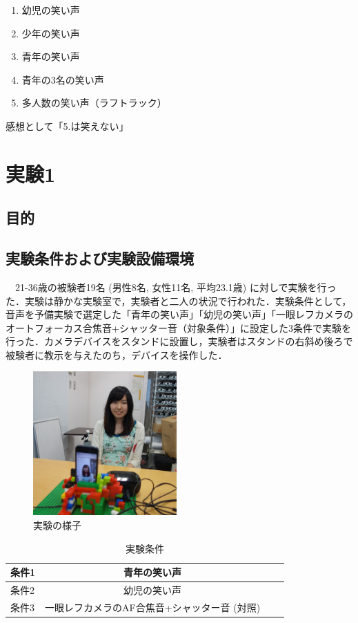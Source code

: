 \documentclass[submit,techreq]{ec2014}
\begin{document}
\begin{enumerate}
 \item 幼児の笑い声
 \item 少年の笑い声
 \item 青年の笑い声
 \item 青年の3名の笑い声
 \item 多人数の笑い声（ラフトラック）
\end{enumerate}

感想として「5.は笑えない」

\section{実験1}
\subsection{目的}

\subsection{実験条件および実験設備環境}

　21-36歳の被験者19名 (男性8名, 女性11名, 平均23.1歳) に対しで実験を行った．実験は静かな実験室で，実験者と二人の状況で行われた．実験条件として，音声を予備実験で選定した「青年の笑い声」「幼児の笑い声」「一眼レフカメラのオートフォーカス合焦音+シャッター音（対象条件）」に設定した3条件で実験を行った．カメラデバイスをスタンドに設置し，実験者はスタンドの右斜め後ろで被験者に教示を与えたのち，デバイスを操作した．

\begin{figure}[h!]
  \centering  
\includegraphics[width=55mm, bb=0 0 2312 2312]{images/DSC05173.jpg}
\caption{実験の様子}
  \label{recursive}
\end{figure}


\begin{table}[htb]
  \begin{center}
    \caption{実験条件}
    \begin{tabular}{|l|c|r||r|} \hline
      条件1 & 青年の笑い声 \\ \hline 
      条件2 & 幼児の笑い声 \\ \hline
      条件3 & 一眼レフカメラのAF合焦音+シャッター音 (対照) \\ \hline
    \end{tabular}
    \label{tab:price}
  \end{center}
\end{table}
\end{document}
